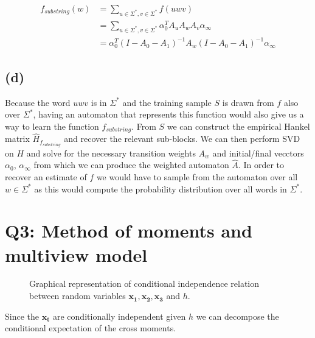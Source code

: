 \documentclass[11pt]{amsart}
\newcommand{\vek}[1]{\mathbf{#1}}
\begin{document}
\begin{equation}
\begin{aligned}
f_{substring} (w)  &= \sum_{u \in \Sigma^*, v \in \Sigma^*} f(uwv) \\
			 &=  \sum_{u \in \Sigma^*, v \in \Sigma^*} \alpha_0^T A_u A_w A_v \alpha_{\infty} \\
			 &=   \alpha_0^T (I - A_0 - A_1)^{-1}  A_w (I - A_0 - A_1)^{-1}  \alpha_{\infty}
\end{aligned}
\end{equation}

\subsection{(d)}

Because the word $uwv$ is in $\Sigma^*$ and the training sample $S$ is drawn from $f$ also over $\Sigma^*$, having an automaton that represents this function would also give us a way to learn the function $f_{substring}$. From $S$ we can construct the empirical Hankel matrix $\hat{H}_{f_{substring}}$ and recover the relevant sub-blocks. We can then perform SVD on $H$ and solve for the necessary transition weights $A_w$ and initial/final vecctors $\alpha_0$, $\alpha_{\infty}$ from which we can produce the weighted automaton $\hat{A}$. In order to recover an estimate of $f$ we would have to sample from the automaton over all $w \in \Sigma^*$ as this would compute the probability distribution over all words in $\Sigma^*$. 


\section{Q3: Method of moments and multiview model}

\begin{figure}[h]
\caption{Graphical representation of conditional independence relation between random variables $\vek{x_1, x_2, x_3}$ and $h$.}
\label{fig:graph}
\end{figure}

Since the $\vek{x_t}$ are conditionally independent given $h$ we can decompose the conditional expectation of the cross moments.
\end{document}
